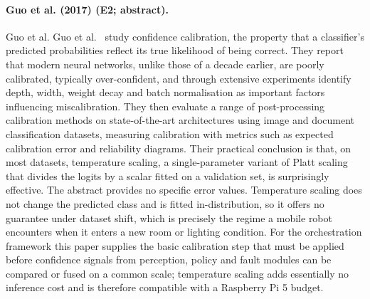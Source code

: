 \documentclass[10pt,a4paper]{article}
\begin{document}
\paragraph{Guo et al. (2017) (E2; abstract).} Guo et al. Guo et al.~\cite{Guo2017} study confidence calibration, the property that a classifier's predicted probabilities reflect its true likelihood of being correct. They report that modern neural networks, unlike those of a decade earlier, are poorly calibrated, typically over-confident, and through extensive experiments identify depth, width, weight decay and batch normalisation as important factors influencing miscalibration. They then evaluate a range of post-processing calibration methods on state-of-the-art architectures using image and document classification datasets, measuring calibration with metrics such as expected calibration error and reliability diagrams. Their practical conclusion is that, on most datasets, temperature scaling, a single-parameter variant of Platt scaling that divides the logits by a scalar fitted on a validation set, is surprisingly effective. The abstract provides no specific error values. Temperature scaling does not change the predicted class and is fitted in-distribution, so it offers no guarantee under dataset shift, which is precisely the regime a mobile robot encounters when it enters a new room or lighting condition. For the orchestration framework this paper supplies the basic calibration step that must be applied before confidence signals from perception, policy and fault modules can be compared or fused on a common scale; temperature scaling adds essentially no inference cost and is therefore compatible with a Raspberry Pi 5 budget.
\end{document}
